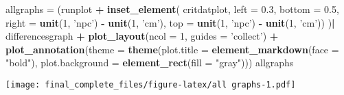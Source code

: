 \documentclass[
]{article}
\newenvironment{Shaded}{\begin{snugshade}}{\end{snugshade}}
\newcommand{\DataTypeTok}[1]{\textcolor[rgb]{0.13,0.29,0.53}{#1}}
\newcommand{\DecValTok}[1]{\textcolor[rgb]{0.00,0.00,0.81}{#1}}
\newcommand{\FloatTok}[1]{\textcolor[rgb]{0.00,0.00,0.81}{#1}}
\newcommand{\KeywordTok}[1]{\textcolor[rgb]{0.13,0.29,0.53}{\textbf{#1}}}
\newcommand{\NormalTok}[1]{#1}
\newcommand{\OperatorTok}[1]{\textcolor[rgb]{0.81,0.36,0.00}{\textbf{#1}}}
\newcommand{\StringTok}[1]{\textcolor[rgb]{0.31,0.60,0.02}{#1}}
\begin{document}
\begin{Shaded}
\begin{Highlighting}[]
\NormalTok{allgraphs =}\StringTok{ }\NormalTok{(runplot }\OperatorTok{+}\StringTok{ }
\StringTok{               }\KeywordTok{inset_element}\NormalTok{(}
\NormalTok{                 critdatplot,}
                 \DataTypeTok{left =} \FloatTok{0.3}\NormalTok{, }
                 \DataTypeTok{bottom =} \FloatTok{0.5}\NormalTok{, }
                 \DataTypeTok{right =} \KeywordTok{unit}\NormalTok{(}\DecValTok{1}\NormalTok{, }\StringTok{'npc'}\NormalTok{) }\OperatorTok{-}\StringTok{ }\KeywordTok{unit}\NormalTok{(}\DecValTok{1}\NormalTok{, }\StringTok{'cm'}\NormalTok{), }
                 \DataTypeTok{top =} \KeywordTok{unit}\NormalTok{(}\DecValTok{1}\NormalTok{, }\StringTok{'npc'}\NormalTok{) }\OperatorTok{-}\StringTok{ }\KeywordTok{unit}\NormalTok{(}\DecValTok{1}\NormalTok{, }\StringTok{'cm'}\NormalTok{))}
\NormalTok{             )}\OperatorTok{|}\StringTok{ }\NormalTok{differencesgraph }\OperatorTok{+}
\StringTok{  }\KeywordTok{plot_layout}\NormalTok{(}\DataTypeTok{ncol =} \DecValTok{1}\NormalTok{, }\DataTypeTok{guides =} \StringTok{'collect'}\NormalTok{) }\OperatorTok{+}
\StringTok{  }\KeywordTok{plot_annotation}\NormalTok{(}\DataTypeTok{theme =} \KeywordTok{theme}\NormalTok{(}\DataTypeTok{plot.title =} \KeywordTok{element_markdown}\NormalTok{(}\DataTypeTok{face =} \StringTok{"bold"}\NormalTok{),}
                                \DataTypeTok{plot.background =} \KeywordTok{element_rect}\NormalTok{(}\DataTypeTok{fill =} \StringTok{"gray"}\NormalTok{)))}
\NormalTok{allgraphs}
\end{Highlighting}
\end{Shaded}

\texttt{[image: final\_complete\_files/figure-latex/all graphs-1.pdf]}
\end{document}
